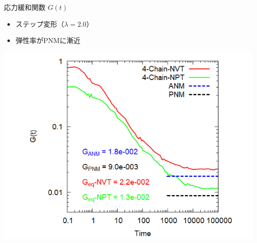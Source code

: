 \documentclass[12pt, dvipdfmx]{beamer}
\begin{document}
\begin{frame}
\begin{columns}[T, onlytextwidth]
			\begin{block}{応力緩和関数 $G(t)$}
				\begin{itemize}
					\item ステップ変形（$\lambda=2.0$）
					\item \alert{弾性率がPNMに漸近}
				\end{itemize}
				\vspace{6mm}
					\includegraphics[width=\textwidth]{gt_4chain_comp.png}
				\end{block}
		\end{columns}
\end{frame}
\end{document}
